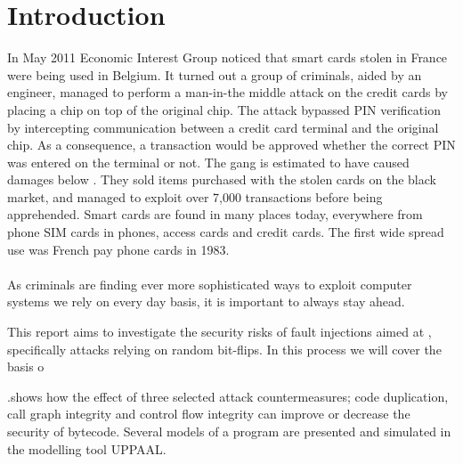 \chapter{Introduction}
In May 2011 Economic Interest Group noticed that smart cards stolen in France were being used in Belgium\cite{fun}. It turned out a group of criminals, aided by an engineer, managed to perform a man-in-the middle attack on the credit cards by placing a chip on top of the original chip. The attack bypassed PIN verification by intercepting communication between a credit card terminal and the original chip. As a consequence, a transaction would be approved whether the correct PIN was entered on the terminal or not. The gang is estimated to have caused damages below . They sold items purchased with the stolen cards on the black market, and managed to exploit over 7,000 transactions before being apprehended. Smart cards are found in many places today, everywhere from phone SIM cards in phones, access cards and credit cards. The first wide spread use was French pay phone cards in 1983\cite[p. 366]{modbank}.\\\\

As criminals are finding ever more sophisticated ways to exploit computer systems we rely on every day basis, it is important to always stay ahead.

This report aims to investigate the security risks of fault injections aimed at \jc, specifically attacks relying on random bit-flips. In this process we will cover the basis o

.shows how the effect of three selected attack countermeasures; code duplication, call graph integrity and control flow integrity can improve or decrease the security of \jc bytecode. Several models of a program are presented and simulated in the modelling tool UPPAAL\cite{upptut}.
